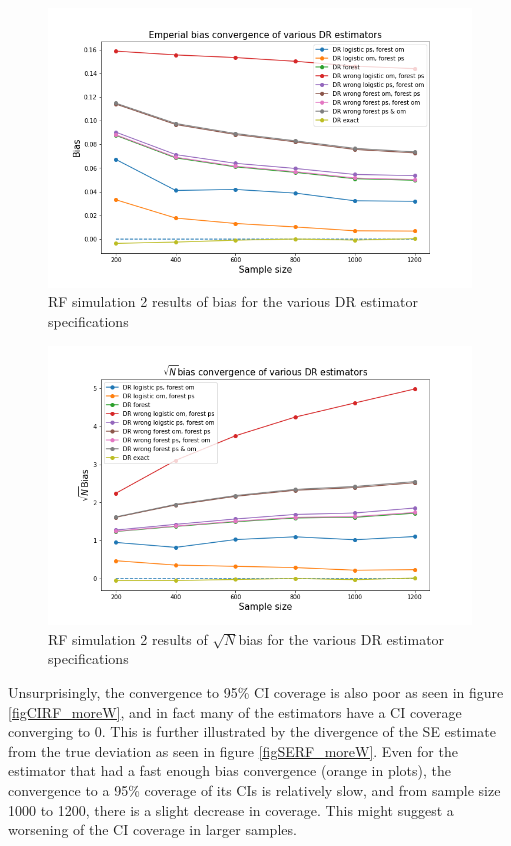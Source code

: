 \documentclass[12pt,twoside]{article}
\begin{document}
\begin{figure}[h!]
    \centering
    \includegraphics[width = 0.9\columnwidth]{figures/biasRF_moreW.png}
    \caption{RF simulation 2 results of bias for the various DR estimator specifications}
    \label{figbiasRF_moreW}
\end{figure}

\begin{figure}[h!]
    \centering
    \includegraphics[width = 0.9\columnwidth]{figures/sqrtnRF_moreW.png}
    \caption{RF simulation 2 results of $\sqrt{N}$bias for the various DR estimator specifications}
    \label{figsqrtnRF_moreW}
\end{figure}

Unsurprisingly, the convergence to 95\% CI coverage is also poor as seen in figure \ref{figCIRF_moreW}, and in fact many of the estimators have a CI coverage converging to 0. This is further illustrated by the divergence of the SE estimate from the true deviation as seen in figure \ref{figSERF_moreW}. Even for the estimator that had a fast enough bias convergence (orange in plots), the convergence to a 95\% coverage of its CIs is relatively slow, and from sample size 1000 to 1200, there is a slight decrease in coverage. This might suggest a worsening of the CI coverage in larger samples.
\end{document}
